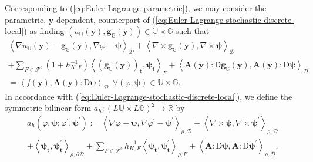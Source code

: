 \documentclass[final,onefignum,onetabnum]{mousaviart}
\begin{document}
	Corresponding to (\ref{eq:Euler-Lagrange-parametric}), we may consider the parametric, $\boldsymbol{y}$-dependent, counterpart of (\ref{eq:Euler-Lagrange-stochastic-discrete-local}) as finding  $(u_\mathbb{U}(\boldsymbol{y}), \boldsymbol{g}_\mathbb{G}(\boldsymbol{y})) \in \mathbb{U} \times \mathbb{G} $ such that
	\begin{multline}
		\label{eq:Euler-Lagrange-stochastic-discrete-local-parametric}
		\left\langle \nabla u_{\mathbb{U}} (\boldsymbol{y}) - \boldsymbol{g}_{\mathbb{G}} (\boldsymbol{y}), \nabla\varphi - \boldsymbol{\psi} \right\rangle_{\mathcal{D}}  
		+
		\left\langle  \nabla \times \boldsymbol{g}_{\mathbb{G}}(\boldsymbol{y}), \nabla \times \boldsymbol{\psi} \right\rangle_{ \mathcal{D}} 
		\\
		+
		\sum_{F \in \mathcal{F}^b} \left( 1 + h_{K,F}^{-1} \right) \left\langle  \left( \boldsymbol{g}_{\mathbb{G}}(\boldsymbol{y})\right) _{\boldsymbol{t}} , \boldsymbol{\psi}_{\boldsymbol{t}} \right\rangle _{ F}
		+
		\left\langle  \boldsymbol{A}(\boldsymbol{y}):\mathrm{D} \boldsymbol{g}_{\mathbb{G}}(\boldsymbol{y}), \boldsymbol{A}(\boldsymbol{y}):\mathrm{D} \boldsymbol{\psi} \right\rangle_{\mathcal{D}}
		\\ 
		= 
		\left\langle  f(\boldsymbol{y}), \boldsymbol{A}(\boldsymbol{y}):\mathrm{D} \boldsymbol{\psi} \right\rangle_{ \mathcal{D}} 
		~~
		\forall (\varphi, \boldsymbol{\psi}) \in 
		\mathbb{U}   \times \mathbb{G}.
	\end{multline}
	In accordance with (\ref{eq:Euler-Lagrange-stochastic-discrete-local}), we define the symmetric bilinear form $a_h: \left( L \mathbb{U}  \times L \mathbb{G} \right)^2  \rightarrow \mathbb{R}$ by
	\begin{multline}
		\label{def:stochastic-bilinear-a-discerete-local}
		a_h (\varphi, \boldsymbol{\psi}; \varphi^{\prime}, \boldsymbol{\psi}^{\prime}):=
		\left\langle \nabla\varphi - \boldsymbol{\psi} , \nabla\varphi^{\prime} - \boldsymbol{\psi}^{\prime}  \right\rangle_{\rho, \mathcal{D}}  
		+
		\left\langle  \nabla \times \boldsymbol{\psi}, \nabla \times \boldsymbol{\psi}^{\prime} \right\rangle_{\rho, \mathcal{D}}  
		\\
		+
		\left\langle  \boldsymbol{\psi}_{\boldsymbol{t}} , \boldsymbol{\psi}^{\prime}_{\boldsymbol{t}} \right\rangle _{\rho,\partial \mathcal{D}}
		+
		\sum_{ F \in \mathcal{F}^b} h_{K,F}^{-1}\left\langle  \boldsymbol{\psi}_{\boldsymbol{t}} , \boldsymbol{\psi}^{\prime}_{\boldsymbol{t}} \right\rangle _{\rho,F}
		+
		\left\langle  \boldsymbol{A}: \mathrm{D} \boldsymbol{\psi}, \boldsymbol{A}: \mathrm{D} \boldsymbol{\psi}^{\prime} \right\rangle_{\rho,\mathcal{D}}. 
	\end{multline}
	
\end{document}

